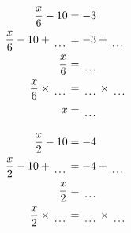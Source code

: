 \documentclass[12pt]{article}
\newcounter{minipagecount}
\begin{document}
\begin{multicols}{2}
\begin{minipage}[t]{0.45\textwidth}
    \raggedright %
    \begin{align*} %
        \frac{x}{6} - 10 &= -3\\
        \frac{x}{6} - 10 + \dotuline{\hspace{5mm}} &= -3 + \dotuline{\hspace{5mm}}\\
        \frac{x}{6} &= \dotuline{\hspace{5mm}}\\
        \frac{x}{6} \times\dotuline{\hspace{5mm}} &= \dotuline{\hspace{5mm}} \times\dotuline{\hspace{5mm}}\\
        x &= \dotuline{\hspace{5mm}}\\
    \end{align*}
\end{minipage} %
\noindent{(\theminipagecount)}\hspace{0.1mm} %
\begin{minipage}[t]{0.45\textwidth} %
    \vspace{-26pt}  %
    \raggedright %
    \begin{align*} %
        \frac{x}{2} - 10 &= -4\\
        \frac{x}{2} - 10 + \dotuline{\hspace{5mm}} &= -4 + \dotuline{\hspace{5mm}}\\
        \frac{x}{2} &= \dotuline{\hspace{5mm}}\\
        \frac{x}{2} \times\dotuline{\hspace{5mm}} &= \dotuline{\hspace{5mm}} \times\dotuline{\hspace{5mm}}\\

\end{align*}
\end{minipage}
\end{multicols}
\end{document}
